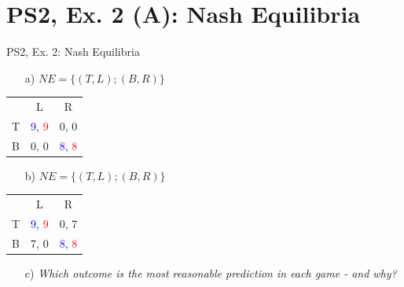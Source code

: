 \section{PS2, Ex. 2 (A): Nash Equilibria}

\begin{frame}{PS2, Ex. 2: Nash Equilibria}
  \begin{itemize}
    \item[a)] $NE=\{(T,L);(B,R)\}$
  \end{itemize}
  \begin{table}
    \begin{tabular}{c|c|c|}
        \multicolumn{1}{c}{} & \multicolumn{1}{c}{L}  & \multicolumn{1}{c}{R} \\\cline{2-3}
        T & \textcolor{blue}{9}, \textcolor{red}{9} & 0, 0 \\\cline{2-3}
        B & 0, 0 & \textcolor{blue}{8}, \textcolor{red}{8} \\\cline{2-3}
    \end{tabular}
  \end{table}
  \begin{itemize}
    \item[b)] $NE=\{(T,L);(B,R)\}$
  \end{itemize}
  \begin{table}
    \begin{tabular}{c|c|c|}
        \multicolumn{1}{c}{} & \multicolumn{1}{c}{L}  & \multicolumn{1}{c}{R} \\\cline{2-3}
        T & \textcolor{blue}{9}, \textcolor{red}{9} & 0, 7 \\\cline{2-3}
        B & 7, 0 & \textcolor{blue}{8}, \textcolor{red}{8} \\\cline{2-3}
    \end{tabular}
  \end{table}
  \begin{itemize}
    \item[c)] \textit{Which outcome is the most reasonable prediction in each game - and why?}
  \end{itemize}
\end{frame}
